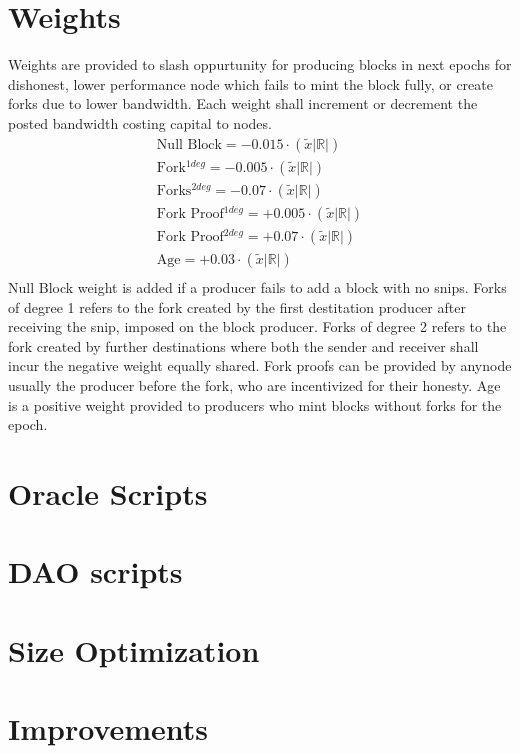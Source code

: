 \documentclass[a4paper,10pt]{article}
\begin{document}
\section{Weights}
Weights are provided to slash oppurtunity for producing blocks in next epochs for dishonest, lower performance node which fails to mint the block fully, or create forks due to lower bandwidth. Each weight shall increment or decrement the posted bandwidth costing capital to nodes.
\begin{align*}
\text{Null Block} = -0.015 \cdot (\widetilde{x}|\mathbb{R}|)\\
\text{Fork$^{1deg}$} = -0.005 \cdot (\widetilde{x}|\mathbb{R}|)\\
\text{Forks$^{2deg}$} = -0.07 \cdot (\widetilde{x}|\mathbb{R}|)\\
\text{Fork Proof$^{1deg}$} = +0.005 \cdot (\widetilde{x}|\mathbb{R}|)\\
\text{Fork Proof$^{2deg}$} = +0.07 \cdot (\widetilde{x}|\mathbb{R}|)\\
\text{Age} = +0.03 \cdot (\widetilde{x}|\mathbb{R}|)\\
\end{align*}
Null Block weight is added if a producer fails to add a block with no snips. Forks of degree 1 refers to the fork created by the first destitation producer after receiving the snip, imposed on the block producer. Forks of degree 2 refers to the fork created by further destinations where both the sender and receiver shall incur the negative weight equally shared. Fork proofs can be provided by anynode usually the producer before the fork, who are incentivized for their honesty. Age is a positive weight provided to producers who mint blocks without forks for the epoch.
\section{Oracle Scripts}
\section{DAO scripts}
\section{Size Optimization}
\section{Improvements}
\end{document}
